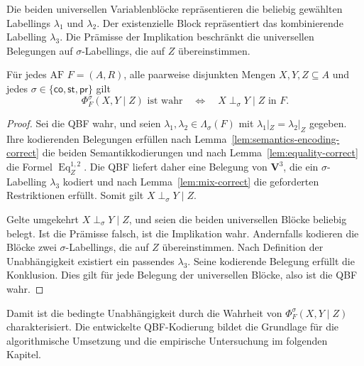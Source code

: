 Die beiden universellen Variablenblöcke repräsentieren die beliebig
gewählten Labellings \(\lambda_1\) und \(\lambda_2\). Der existenzielle
Block repräsentiert das kombinierende Labelling \(\lambda_3\). Die
Prämisse der Implikation beschränkt die universellen Belegungen auf
\(\sigma\)-Labellings, die auf \(Z\) übereinstimmen.
\begin{Theorem}
    \label{thm:generic-independence-qbf-correct}
    Für jedes \(\text{AF }F=(A,R)\), alle paarweise disjunkten Mengen
    \(X,Y,Z\subseteq A\) und jedes
    \(\sigma\in\{\mathsf{co},\mathsf{st},\mathsf{pr}\}\) gilt
    \[
        \Phi^\sigma_F(X,Y\mid Z)\text{ ist wahr}
        \quad\Longleftrightarrow\quad
        X\perp_\sigma Y\mid Z \text{ in } F.
    \]
\end{Theorem}
\begin{proof}
    Sei die QBF wahr, und seien
    \(\lambda_1,\lambda_2\in\Lambda_\sigma(F)\) mit
    \(\lambda_1|_Z=\lambda_2|_Z\) gegeben. Ihre kodierenden Belegungen
    erfüllen nach Lemma~\ref{lem:semantics-encoding-correct} die beiden
    Semantikkodierungen und nach
    Lemma~\ref{lem:equality-correct} die Formel
    \(\operatorname{Eq}^{1,2}_Z\). Die QBF liefert daher eine Belegung von
    \(\mathbf V^3\), die ein \(\sigma\)-Labelling \(\lambda_3\) kodiert
    und nach Lemma~\ref{lem:mix-correct} die geforderten Restriktionen erfüllt. 
    Somit gilt \(X\perp_\sigma Y\mid Z\).

    Gelte umgekehrt \(X\perp_\sigma Y\mid Z\), und seien die beiden
    universellen Blöcke beliebig belegt. Ist die Prämisse falsch, ist die
    Implikation wahr. Andernfalls kodieren die Blöcke zwei
    \(\sigma\)-Labellings, die auf \(Z\) übereinstimmen. Nach Definition
    der Unabhängigkeit existiert ein passendes \(\lambda_3\). Seine
    kodierende Belegung erfüllt die Konklusion. Dies gilt für jede Belegung
    der universellen Blöcke, also ist die QBF wahr.
\end{proof}

Damit ist die bedingte Unabhängigkeit durch die Wahrheit von
\(\Phi_F^\sigma(X,Y\mid Z)\) charakterisiert. Die entwickelte
QBF-Kodierung bildet die Grundlage für die algorithmische Umsetzung und
die empirische Untersuchung im folgenden Kapitel.
